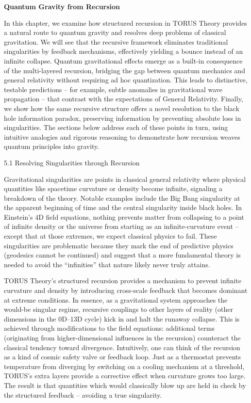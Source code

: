 \documentclass[]{article}
\date{}
\begin{document}
\textbf{Quantum Gravity from Recursion}

In this chapter, we examine how structured recursion in TORUS Theory
provides a natural route to quantum gravity and resolves deep problems
of classical gravitation. We will see that the recursive framework
eliminates traditional singularities by feedback mechanisms, effectively
yielding a bounce instead of an infinite collapse. Quantum gravitational
effects emerge as a built-in consequence of the multi-layered recursion,
bridging the gap between quantum mechanics and general relativity
without requiring ad hoc quantization. This leads to distinctive,
testable predictions -- for example, subtle anomalies in gravitational
wave propagation -- that contrast with the expectations of General
Relativity. Finally, we show how the same recursive structure offers a
novel resolution to the black hole information paradox, preserving
information by preventing absolute loss in singularities. The sections
below address each of these points in turn, using intuitive analogies
and rigorous reasoning to demonstrate how recursion weaves quantum
principles into gravity.

5.1 Resolving Singularities through Recursion

Gravitational singularities are points in classical general relativity
where physical quantities like spacetime curvature or density become
infinite, signaling a breakdown of the theory. Notable examples include
the Big Bang singularity at the apparent beginning of time and the
central singularity inside black holes. In Einstein's 4D field
equations, nothing prevents matter from collapsing to a point of
infinite density or the universe from starting as an infinite-curvature
event -- except that at those extremes, we expect classical physics to
fail. These singularities are problematic because they mark the end of
predictive physics (geodesics cannot be continued) and suggest that a
more fundamental theory is needed to avoid the ``infinities'' that
nature likely never truly attains.

TORUS Theory's structured recursion provides a mechanism to prevent
infinite curvature and density by introducing cross-scale feedback that
becomes dominant at extreme conditions. In essence, as a gravitational
system approaches the would-be singular regime, recursive couplings to
other layers of reality (other dimensions in the 0D--13D cycle) kick in
and halt the runaway collapse. This is achieved through modifications to
the field equations: additional terms (originating from
higher-dimensional influences in the recursion) counteract the classical
tendency toward divergence. Intuitively, one can think of the recursion
as a kind of cosmic safety valve or feedback loop. Just as a thermostat
prevents temperature from diverging by switching on a cooling mechanism
at a threshold, TORUS's extra layers provide a corrective effect when
curvature grows too large. The result is that quantities which would
classically blow up are held in check by the structured feedback --
avoiding a true singularity.
\end{document}
